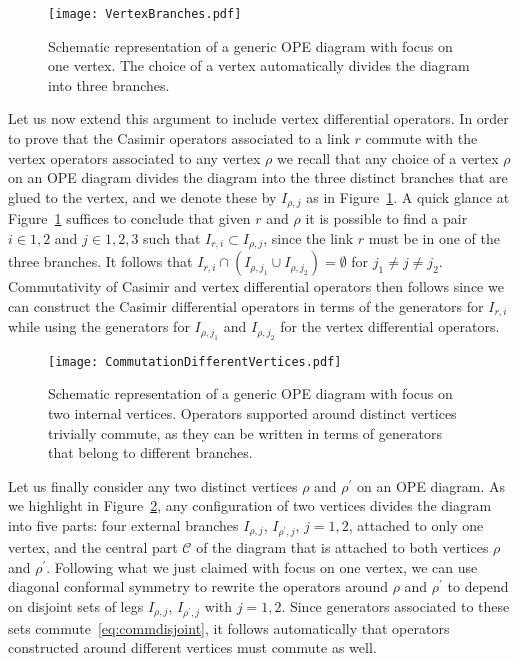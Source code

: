 \documentclass{article}
\begin{document}
\begin{figure}[thb]
\centering
\texttt{[image: VertexBranches.pdf]}
\caption{Schematic representation of a generic OPE diagram with focus on one vertex. The choice of a 
vertex automatically divides the diagram into three branches.}
\label{fig:VertexBranches}
\end{figure}

Let us now extend this argument to include vertex differential operators. 
In order to prove that the Casimir operators associated to a link $r$ 
commute with the vertex operators associated to any vertex $\rho$ we 
recall that any choice of a vertex $\rho$ on an OPE diagram divides the 
diagram into the three distinct branches that are glued to the vertex, and we denote these by $I_{\rho,j}$ as in Figure~\ref{fig:VertexBranches}. A 
quick glance at Figure~\ref{fig:VertexBranches} suffices to conclude that given $r$ and $\rho$ 
it is possible to find a pair $i\in {1,2}$ and $j \in {1,2,3}$ such 
that $I_{r,i} \subset I_{\rho,j}$, since the link $r$ must be in one 
of the three branches. It follows that $I_{r,i} \cap \left(I_{\rho,j_1} \cup 
I_{\rho,j_2}\right) = \emptyset$ for $j_1 \neq j \neq j_2$. Commutativity of 
Casimir and vertex differential operators then follows since we 
can construct the Casimir differential operators in terms of the 
generators for $I_{r,i}$ while using the generators for $I_{\rho,j_1}$
and $I_{\rho,j_2}$ for the vertex differential operators. 

\begin{figure}[thb]
\centering
\texttt{[image: CommutationDifferentVertices.pdf]}
\caption{Schematic representation of a generic OPE diagram with focus on two internal 
vertices. Operators supported around distinct vertices trivially commute, as they can be 
written in terms of generators that belong to different branches.}
\label{fig:CommutationDifferentVertices}
\end{figure}

Let us finally consider any two distinct vertices $\rho$ and $\rho^{\prime}$ on an OPE diagram. 
As we highlight in Figure~\ref{fig:CommutationDifferentVertices}, any configuration of two 
vertices divides the diagram into five parts: four external branches $I_{\rho,j}$, $I_{\rho^{\prime},j}$, 
$j=1,2$, attached to only one vertex, and the central part $\mathcal{C}$ of the diagram that is 
attached to both vertices $\rho$ and $\rho^{\prime}$. Following what we just claimed with focus on 
one vertex, we can use diagonal conformal 
symmetry to rewrite the operators around $\rho$ and $\rho^{\prime}$ to depend on disjoint 
sets of legs $I_{\rho,j}$, $I_{\rho^{\prime},j}$ with $j=1,2$. Since generators associated 
to these sets commute~\eqref{eq:commdisjoint}, it follows automatically that operators constructed 
around different vertices must commute as well.
\end{document}
